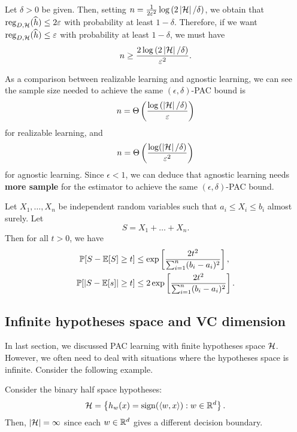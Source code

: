 \documentclass[a4paper]{article}
\begin{document}
\begin{cor}
Let $\delta > 0$ be given. Then,
setting
$n = \frac{1}{2\varepsilon^2} \log \left( 2 \left\lvert \mathcal{H}\right\rvert /
\delta \right)$, we obtain that $\operatorname{reg}_{D, \mathcal{H}} (\widehat{h})
\leq 2\varepsilon$ with probability at least $1 - \delta$.
Therefore, if we want $\operatorname{reg}_{D, \mathcal{H}}
(\widehat{h}) \leq \varepsilon$ with probability at least $1 -
\delta$, we must have
\[
  n \geq \frac{2 \log
  \left( 2 \left\lvert \mathcal{H}\right\rvert / \delta \right)}
  {\varepsilon^2}.
\]
\end{cor}

As a comparison between realizable learning and agnostic
learning, we can see the sample size needed to
achieve the same $(\epsilon, \delta)$-PAC bound is
\[
n = \Theta \left( \frac{\log \left( \left\lvert \mathcal{H}\right\rvert / \delta
\right)}{\varepsilon} \right)
\]
for realizable learning, and
\[
n = \Theta \left( \frac{\log(\left\lvert \mathcal{H}\right\rvert / \delta)}{\varepsilon^2}
\right)
\]
for agnostic learning. Since $\epsilon < 1$,
we can deduce that agnostic learning needs
\textbf{more sample} for the estimator to achieve the
same $(\epsilon, \delta)$-PAC bound.



\begin{thm}
Let $X_1, \dots, X_n$ be independent random variables
such that $a_i \leq X_i \leq b_i$ almost surely.
Let 
\[
S = X_1 + \dots + X_n.
\]
Then for all $t > 0$, we have 
\[
\begin{aligned}
\mathbb{P} [S - \mathbb{E}[S] \geq t] &\leq \exp \left[ \frac{2t^2}
{\sum_{i=1}^n (b_i - a_i)^2} \right], \\
\mathbb{P} [\left\lvert S - \mathbb{E}[s]\right\rvert \geq t] &\leq 2\exp \left[ \frac{2t^2}
{\sum_{i=1}^n (b_i - a_i)^2} \right].
\end{aligned}
\]
\end{thm}
  

\subsection{Infinite hypotheses space and VC dimension}

In last section, we discussed PAC learning with finite
hypotheses space $\mathcal{H}$. However, we often need
to deal with situations where the hypotheses space
is infinite. Consider the following example.

\begin{eg}
  Consider the binary half space hypotheses:
  \[
  \mathcal{H} = \left\{ h_w(x) =
  \operatorname{sign}(\left\langle w, x \right\rangle) : w \in \mathbb{R}^d \right\}.
  \]
  Then, $\left\lvert \mathcal{H}\right\rvert = \infty$ since each
  $w \in \mathbb{R}^d$ gives a different decision boundary.
\end{eg}
\end{document}
